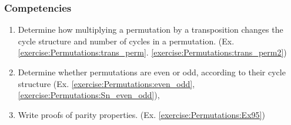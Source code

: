 \subsubsection*{Competencies}
\begin{enumerate}
\item
 Determine how multiplying a permutation by a transposition changes the cycle structure and number of cycles in a  permutation.  (Ex. \ref{exercise:Permutations:trans_perm}. \ref{exercise:Permutations:trans_perm2})
\item
Determine whether permutations are even or odd, according to their cycle structure (Ex. \ref{exercise:Permutations:even_odd},  \ref{exercise:Permutations:Sn_even_odd}),
\item
Write proofs of parity properties. (Ex. \ref{exercise:Permutations:Ex95})
\end{enumerate}
%
%
%
%
%
%
%
%





